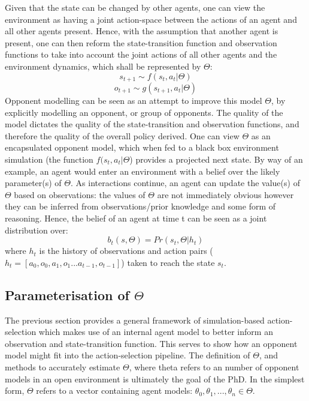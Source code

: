 \newline \newline
Given that the state can be changed by other agents, one can view the environment as having a joint action-space between the actions of an agent and all other agents present. Hence, with the assumption that another agent is present, one can then reform the state-transition function and observation functions to take into account the joint actions of all other agents and the environment dynamics, which shall be represented by $\Theta$: 
\begin{equation}
    s_{t+1} \sim f(s_t, a_t|\Theta) 
\end{equation}
\begin{equation}
    o_{t+1} \sim g(s_{t+1}, a_t|\Theta) 
\end{equation}
\newline \newline
Opponent modelling can be seen as an attempt to improve this model $\Theta$, by explicitly modelling an opponent, or group of opponents.
The quality of the model dictates the quality of the state-transition and observation functions, and therefore the quality of the overall policy derived. 
\newline \newline
One can view $\Theta$ as an encapsulated opponent model, which when fed to a black box environment simulation (the function $ f(s_t, a_t|\Theta$) provides a projected next state.
\newline \newline
By way of an example, an agent would enter an environment with a belief over the likely parameter(s) of $\Theta$. As interactions continue, an agent can update the value(s) of $\Theta$ based on observations: the values of $\Theta$ are not immediately obvious however they can be inferred from observations/prior knowledge and some form of reasoning. Hence, the belief of an agent at time t can be seen as a joint distribution over:
\begin{equation}
    b_t(s,\Theta) = Pr(s_t,\Theta | h_t)
\end{equation}
where $h_t$ is the history of observations and action pairs ($h_t = [a_0, o_0, a_1, o_1 ... a_{t-1}, o_{t-1}]$) taken to reach the state $s_t$.

\subsection{Parameterisation of $\Theta$}
The previous section provides a general framework of simulation-based action-selection which makes use of an internal agent model to better inform an observation and state-transition function. This serves to show how an opponent model might fit into the action-selection pipeline.
\newline \newline
The definition of $\Theta$, and methods to accurately estimate $\Theta$, where theta refers to an number of opponent models in an open environment is ultimately the goal of the PhD.
\newline\newline
In the simplest form, $\Theta$ refers to a vector containing agent models: ${\theta_0, \theta_1,...,\theta_n} \in \Theta$. 
